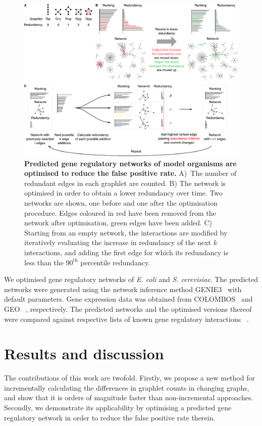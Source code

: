 \begin{figure}[ht!]
	\centering
	\includegraphics[width=.9\linewidth]{fig/figure4.pdf}
	\caption{{\bf Predicted gene regulatory networks of model organisms are optimised to reduce the false positive rate.}
		A)~The number of redundant edges in each graphlet are counted. B) The network is optimised in order to obtain a lower redundancy over time. Two networks are shown, one before and one after the optimisation procedure. Edges coloured in red have been removed from the network after optimisation, green edges have been added. C) Starting from an empty network, the interactions are modified by iteratively evaluating the increase in redundancy of the next $k$ interactions, and adding the first edge for which its redundancy is less than the $90^\textrm{th}$ percentile redundancy.}
	\label{fig_method_reranking}
\end{figure}

We optimised gene regulatory networks of \textit{E. coli} and \textit{S. cerevisiae}. The predicted networks were generated using the network inference method GENIE3~ \cite{huynh-thu_inferringregulatorynetworks_2010} with default parameters. Gene expression data was obtained from COLOMBOS~ \cite{moretto_colombosv3leveraging_2016} and GEO~ \cite{edgar_geneexpressionomnibus_2002}, respectively. The predicted networks and the optimised versions thereof were compared against respective lists of known gene regulatory interactions~ \cite{gama-castro_regulondbversionhighlevel_2016,ma_denovolearninggenomescale_2014}.

\section*{Results and discussion}
The contributions of this work are twofold. Firstly, we propose a new method for incrementally calculating the differences in graphlet counts in changing graphs, and show that it is orders of magnitude faster than non-incremental approaches. Secondly, we demonstrate its applicability by optimising a predicted gene regulatory network in order to reduce the false positive rate therein.

